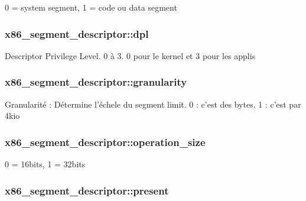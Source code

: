 0 = system segment, 1 = code ou data segment \hypertarget{structx86__segment__descriptor_ab45e49c27bbe57a568d914bd13e45ef7}{
\subsubsection[{dpl}]{ {\bf x86\-\_\-segment\-\_\-descriptor\-::dpl}}}\label{structx86__segment__descriptor_ab45e49c27bbe57a568d914bd13e45ef7}
\-Descriptor \-Privilege \-Level. 0 à 3. 0 pour le kernel et 3 pour les applis \hypertarget{structx86__segment__descriptor_a19d5da93d41a1ec3327cbd92ace8fa08}{
\subsubsection[{granularity}]{ {\bf x86\-\_\-segment\-\_\-descriptor\-::granularity}}}\label{structx86__segment__descriptor_a19d5da93d41a1ec3327cbd92ace8fa08}
\-Granularité \-: \-Détermine l'échele du segment limit. 0 \-: c'est des bytes, 1 \-: c'est par 4kio \hypertarget{structx86__segment__descriptor_a40c320788bf23e3660d0def872cec94c}{
\subsubsection[{operation\-\_\-size}]{ {\bf x86\-\_\-segment\-\_\-descriptor\-::operation\-\_\-size}}}\label{structx86__segment__descriptor_a40c320788bf23e3660d0def872cec94c}
0 = 16bits, 1 = 32bits \hypertarget{structx86__segment__descriptor_ad4196191d05e69b42272a411a69d1eae}{
\subsubsection[{present}]{ {\bf x86\-\_\-segment\-\_\-descriptor\-::present}}}\label{structx86__segment__descriptor_ad4196191d05e69b42272a411a69d1eae}
